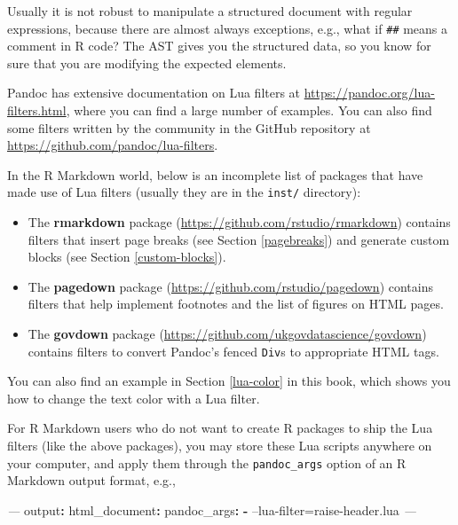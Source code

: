 \documentclass[
  11pt,
]{krantz}
\newenvironment{Shaded}{\begin{snugshade}}{\end{snugshade}}
\newcommand{\AttributeTok}[1]{\textcolor[rgb]{0.61,0.61,0.61}{#1}}
\newcommand{\FunctionTok}[1]{\textcolor[rgb]{0,0,0}{#1}}
\newcommand{\KeywordTok}[1]{\textcolor[rgb]{0.27,0.27,0.27}{\textbf{#1}}}
\newcommand{\PreprocessorTok}[1]{\textcolor[rgb]{0.37,0.37,0.37}{\textit{#1}}}
\begin{document}
Usually it is not robust to manipulate a structured document with regular expressions, because there are almost always exceptions, e.g., what if \texttt{\#\#} means a comment in R code? The AST gives you the structured data, so you know for sure that you are modifying the expected elements.

Pandoc has extensive documentation on Lua filters at \url{https://pandoc.org/lua-filters.html}, where you can find a large number of examples. You can also find some filters written by the community in the GitHub repository at \url{https://github.com/pandoc/lua-filters}.

In the R Markdown world, below is an incomplete list of packages that have made use of Lua filters (usually they are in the \texttt{inst/} directory):

\begin{itemize}
\item
  The \textbf{rmarkdown} package (\url{https://github.com/rstudio/rmarkdown}) contains filters that insert page breaks (see Section \ref{pagebreaks}) and generate custom blocks (see Section \ref{custom-blocks}).
\item
  The \textbf{pagedown} package (\url{https://github.com/rstudio/pagedown}) contains filters that help implement footnotes and the list of figures on HTML pages.
\item
  The \textbf{govdown} package (\url{https://github.com/ukgovdatascience/govdown}) contains filters to convert Pandoc's fenced \texttt{Div}s to appropriate HTML tags.
\end{itemize}

You can also find an example in Section \ref{lua-color} in this book, which shows you how to change the text color with a Lua filter.

For R Markdown users who do not want to create R packages to ship the Lua filters (like the above packages), you may store these Lua scripts anywhere on your computer, and apply them through the \texttt{pandoc\_args} option of an R Markdown output format, e.g.,

\begin{Shaded}
\begin{Highlighting}[]
\PreprocessorTok{---}
\FunctionTok{output}\KeywordTok{:}
\AttributeTok{  }\FunctionTok{html_document}\KeywordTok{:}
\AttributeTok{    }\FunctionTok{pandoc_args}\KeywordTok{:}
\AttributeTok{      }\KeywordTok{-}\AttributeTok{ --lua-filter=raise-header.lua}
\PreprocessorTok{---}
\end{Highlighting}
\end{Shaded}
\end{document}
